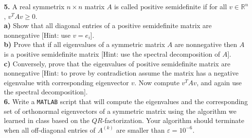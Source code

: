 \documentclass[11pt]{amsart}
\theoremstyle{definition}  %
\begin{document}
\noindent
{\bf 5.} A real symmetrix $n \times n$ matrix $A$ is called positive semidefinite if for all $v \in \mathbb{R}^n$, $v^TAv \geq 0$. \\
{\bf a)} Show that all diagonal entries of a positive semidefinite matrix are nonnegative [Hint: use $v = e_i$]. \\
{\bf b)} Prove that if all eigenvalues of a symmetric matrix $A$ are nonnegative then $A$ is a positive semidefinite matrix [Hint: use the spectral decomposition of $A$]. \\
{\bf c)} Conversely, prove that the eigenvalues of positive semidefinite matrix are nonnegative [Hint: to prove by contradiction assume the matrix has a negative eigenvalue with
corresponding eigenvector $v$. Now compute $v^TAv$, and again use the spectral decomposition].\\


\noindent
{\bf 6.} Write a {\tt MATLAB} script that will compute the eigenvalues and the corresponding set of orthonormal eigenvectors of a symmetric matrix using the algorithm we learned in
class based on the $QR$-factorization. Your algorithm should terminate when all off-diagonal entries of $A^{(k)}$ are smaller than $\varepsilon =10^{-6}$. 





 
\end{document}
